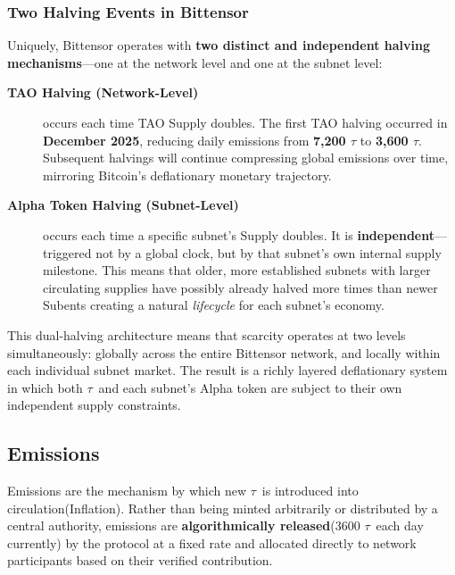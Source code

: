\documentclass[12pt, a4paper, oneside]{report}
\newcommand{\TAO}{$\tau$}            %
\theoremstyle{definition}
\begin{document}
\subsubsection*{Two Halving Events in Bittensor}

Uniquely, Bittensor operates with \textbf{two distinct and independent halving 
mechanisms}—one at the network level and one at the subnet level:

\begin{description}
  \item[\textbf{TAO Halving (Network-Level)}] occurs each time TAO Supply doubles. The first TAO halving occurred in 
  \textbf{December 2025}, reducing daily emissions from \textbf{7,200 \TAO} to 
  \textbf{3,600 \TAO}. Subsequent halvings will continue compressing 
  global emissions over time, mirroring Bitcoin's deflationary monetary trajectory.

  \item[\textbf{Alpha Token Halving (Subnet-Level)}] occurs each time a specific subnet's Supply doubles. It
  is \textbf{independent}—triggered not by a global clock, but by that subnet's own 
  internal supply milestone. This means that older, more 
  established subnets with larger circulating supplies have possibly already halved more times than newer Subents creating a natural 
  \emph{lifecycle} for each subnet's economy.
\end{description}

This dual-halving architecture means that scarcity operates at two levels 
simultaneously: globally across the entire Bittensor network, and locally within 
each individual subnet market. The result is a richly layered deflationary system 
in which both \TAO\ and each subnet's Alpha token are subject to their own 
independent supply constraints.




\subsection{Emissions}

Emissions are the mechanism by which new \TAO\ is introduced into circulation(Inflation). 
Rather than being minted arbitrarily or distributed by a central authority, 
emissions are \textbf{algorithmically released}(3600 \TAO\ each day currently)  by the protocol at a fixed rate 
and allocated directly to network participants based on their verified contribution.\\[0.4cm]
\end{document}
